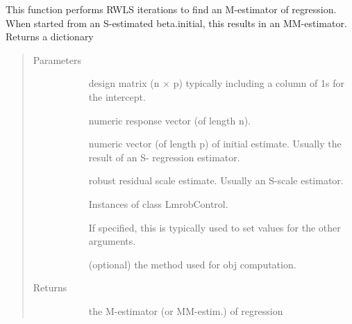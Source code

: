 \documentclass[letterpaper,10pt,english]{sphinxmanual}
\begin{document}
\begin{fulllineitems}
\label{\detokenize{_modules/lmrob:lmrob.lmrob__M__fit}}
This function performs RWLS iterations to find an M-estimator of regression. When started from
an S-estimated beta.initial, this results in an MM-estimator. Returns a dictionary
\begin{quote}\begin{description}
\item[{Parameters}] \leavevmode\begin{description}
\item[{}] \leavevmode
design matrix (n × p) typically including a column of 1s for the intercept.

\item[{}] \leavevmode
numeric response vector (of length n).

\item[{}] \leavevmode
numeric vector (of length p) of initial estimate. Usually the result of an S-
regression estimator.

\item[{}] \leavevmode
robust residual scale estimate. Usually an S-scale estimator.

\item[{}] \leavevmode
Instances of class LmrobControl.

\item[{}] \leavevmode
If specified, this is typically used to set values for the
other arguments.

\item[{}] \leavevmode
(optional) the method used for obj computation.

\end{description}

\item[{Returns}] \leavevmode\begin{description}
\item[{}] \leavevmode
the M-estimator (or MM-estim.) of regression


\end{description}
\end{description}
\end{quote}
\end{fulllineitems}
\end{document}

